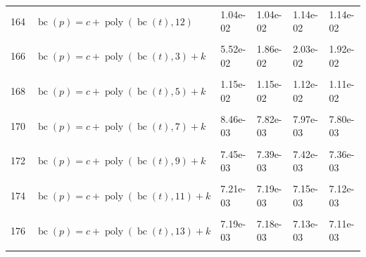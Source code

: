 \documentclass[12pt,a4paper]{article}
\DeclareMathOperator{\bc}{bc}
\DeclareMathOperator{\poly}{poly}
\begin{document}
\begin{longtable}[t]{ll>{\raggedleft\arraybackslash}p{2cm}>{\raggedleft\arraybackslash}p{2cm}>{\raggedleft\arraybackslash}p{2cm}>{\raggedleft\arraybackslash}p{2cm}}
164 & $\bc(p) = c + \poly\left( \bc(t), 12 \right)$ & 1.04e-02 & 1.04e-02 & 1.14e-02 & 1.14e-02\\
\cellcolor{gray!6}{165} & \cellcolor{gray!6}{$\bc(p) = c + \poly\left( \bc(t), 13 \right)$} & \cellcolor{gray!6}{1.04e-02} & \cellcolor{gray!6}{1.04e-02} & \cellcolor{gray!6}{1.14e-02} & \cellcolor{gray!6}{1.14e-02}\\
166 & $\bc(p) = c + \poly\left( \bc(t), 3 \right) + k$ & 5.52e-02 & 1.86e-02 & 2.03e-02 & 1.92e-02\\
\cellcolor{gray!6}{167} & \cellcolor{gray!6}{$\bc(p) = c + \poly\left( \bc(t), 4 \right) + k$} & \cellcolor{gray!6}{2.36e-02} & \cellcolor{gray!6}{2.22e-02} & \cellcolor{gray!6}{2.45e-02} & \cellcolor{gray!6}{2.38e-02}\\
168 & $\bc(p) = c + \poly\left( \bc(t), 5 \right) + k$ & 1.15e-02 & 1.15e-02 & 1.12e-02 & 1.11e-02\\
\cellcolor{gray!6}{169} & \cellcolor{gray!6}{$\bc(p) = c + \poly\left( \bc(t), 6 \right) + k$} & \cellcolor{gray!6}{9.95e-03} & \cellcolor{gray!6}{9.03e-03} & \cellcolor{gray!6}{1.03e-02} & \cellcolor{gray!6}{9.21e-03}\\
170 & $\bc(p) = c + \poly\left( \bc(t), 7 \right) + k$ & 8.46e-03 & 7.82e-03 & 7.97e-03 & 7.80e-03\\
\cellcolor{gray!6}{171} & \cellcolor{gray!6}{$\bc(p) = c + \poly\left( \bc(t), 8 \right) + k$} & \cellcolor{gray!6}{7.38e-03} & \cellcolor{gray!6}{7.35e-03} & \cellcolor{gray!6}{7.34e-03} & \cellcolor{gray!6}{7.30e-03}\\
172 & $\bc(p) = c + \poly\left( \bc(t), 9 \right) + k$ & 7.45e-03 & 7.39e-03 & 7.42e-03 & 7.36e-03\\
\cellcolor{gray!6}{173} & \cellcolor{gray!6}{$\bc(p) = c + \poly\left( \bc(t), 10 \right) + k$} & \cellcolor{gray!6}{7.21e-03} & \cellcolor{gray!6}{7.19e-03} & \cellcolor{gray!6}{7.14e-03} & \cellcolor{gray!6}{7.12e-03}\\
174 & $\bc(p) = c + \poly\left( \bc(t), 11 \right) + k$ & 7.21e-03 & 7.19e-03 & 7.15e-03 & 7.12e-03\\
\cellcolor{gray!6}{175} & \cellcolor{gray!6}{$\bc(p) = c + \poly\left( \bc(t), 12 \right) + k$} & \cellcolor{gray!6}{7.19e-03} & \cellcolor{gray!6}{7.18e-03} & \cellcolor{gray!6}{7.13e-03} & \cellcolor{gray!6}{7.11e-03}\\
176 & $\bc(p) = c + \poly\left( \bc(t), 13 \right) + k$ & 7.19e-03 & 7.18e-03 & 7.13e-03 & 7.11e-03\\
\cellcolor{gray!6}{177} & \cellcolor{gray!6}{$\bc(p) = c + \poly\left( \bc(t), 3 \right) * k$} & \cellcolor{gray!6}{5.41e-02} & \cellcolor{gray!6}{1.74e-02} & \cellcolor{gray!6}{1.94e-02} & \cellcolor{gray!6}{1.82e-02}\\

\end{longtable}
\end{document}
